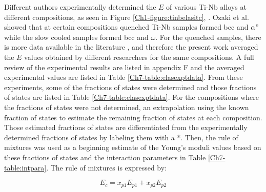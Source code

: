 Different authors experimentally determined the $E$ of various Ti-Nb alloys at different compositions, as seen in Figure \ref{Ch1-figure:tinbelasitc}, \cite{Friak2012,Timoshevskii2011,Friak2012,Karre2015}. Ozaki et al. \cite{Ozaki2004} showed that at certain compositions quenched Ti-Nb samples formed bcc and $\alpha"$ while the slow cooled samples formed bcc and $\omega$. For the quenched samples, there is more data available in the literature \cite{Friak2012,Timoshevskii2011,Friak2012,Karre2015}, and therefore the present work averaged the $E$ values obtained by different researchers for the same compositions. A full review of the experimental results are listed in appendix F and the averaged experimental values are listed in Table \ref{Ch7-table:elasexptdata}. From these experiments, some of the fractions of states were determined \cite{Friak2012} and those fractions of states are listed in Table \ref{Ch7-table:elasexptdata}. For the compositions where the fractions of states were not determined, an extrapolation using the known fraction of states to estimate the remaining fraction of states at each composition. Those estimated fractions of states are differentiated from the experimentally determined fractions of states by labeling them with a *. Then, the rule of mixtures was used as a beginning estimate of the Young's moduli values based on these fractions of states and the interaction parameters in Table \ref{Ch7-table:intpara}. The rule of mixtures is expressed by:

\begin{equation}
\label{eq:ruleofmix}
E_{c}=x_{p1}E_{p1}+x_{p2}E_{p2}
\end{equation}

